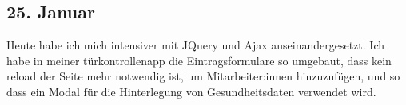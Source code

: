 \subsection{25. Januar}
Heute habe ich mich intensiver mit JQuery und Ajax auseinandergesetzt. Ich habe in meiner türkontrollenapp die Eintragsformulare so umgebaut, dass kein reload der Seite mehr notwendig ist, um Mitarbeiter:innen hinzuzufügen, und so dass ein Modal für die Hinterlegung von Gesundheitsdaten verwendet wird.